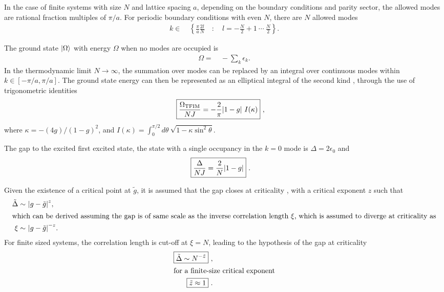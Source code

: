 \documentclass[12pt]{article}{}
\begin{document}
In the case of finite systems with size $N$ and lattice spacing $a$, depending on the boundary conditions and parity sector, the allowed modes are rational fraction multiples of $\pi/a$. For periodic boundary conditions with even $N$, there are $N$ allowed modes
\begin{align}
  k \in &~ \left\{\frac{\pi}{a}\frac{2l}{N} \quad : \quad l = -\frac{N}{2} + 1 ~\cdots~ \frac{N}{2} \right\}.
\end{align}

The ground state $\ket{\Omega}$ with energy $\Omega$ when no modes are occupied is
\begin{align}
  \Omega =&~ -\sum_{k} \epsilon_{k}.
\end{align}
In the thermodynamic limit $N \to \infty$, the summation over modes can be replaced by an integral over continuous modes within $k \in [-\pi/a, \pi/a]$. The ground state energy can then be represented as an elliptical integral of the second kind \cite{Lieb1961}, through the use of trigonometric identities
\begin{align}
  \Aboxed{\frac{\Omega_{\textrm{TFIM}}}{NJ} = -\frac{2}{\pi}\abs{1-g}~I(\kappa)}~, \label{eq:ising_groundenergy}
\end{align}
where $\kappa = -(4g)/(1-g)^2$, and $I(\kappa) = \int_{0}^{\pi/2} d\theta~ \sqrt{1-\kappa\sin^2\theta}$.

The gap to the excited first excited state, the state with a single occupancy in the $k=0$ mode is $\Delta = 2\epsilon_{0}$ and
\begin{align}
  \Aboxed{\frac{\Delta}{NJ} = \frac{2}{N}\abs{1-g}}~.
\end{align}

Given the existence of a critical point at $\tilde{g}$, it is assumed that the gap closes at criticality \cite{Cole2017}, with a critical exponent $z$ such that
\begin{align}
  \tilde{\Delta} \sim&~ \abs{g - \tilde{g}}^{z}, \\
  \intertext{which can be derived assuming the gap is of same scale as the inverse correlation length $\xi$, which is assumed to diverge at criticality as}
  \xi \sim &~ \abs{g - \tilde{g}}^{-z}.
\end{align}
For finite sized systems, the correlation length is cut-off at $\xi = N$, leading to the hypothesis of the gap at criticality
\begin{align}
  \Aboxed{\tilde{\Delta} \sim N^{-\tilde{z}}}~, \label{eq:ising_gap} \\
  \intertext{for a finite-size critical exponent}
  \Aboxed{\tilde{z} \approx 1}~.
\end{align}
\end{document}
